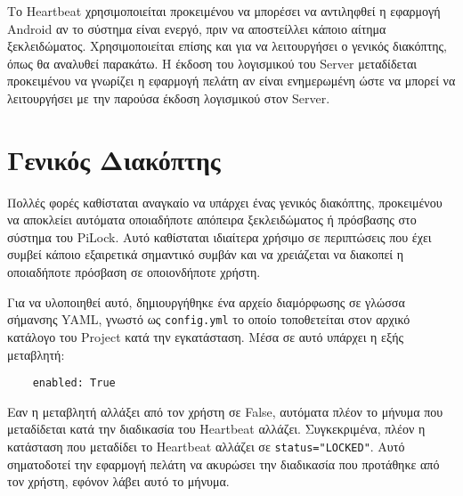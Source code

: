 	Το Heartbeat χρησιμοποιείται προκειμένου να μπορέσει να αντιληφθεί η εφαρμογή Android αν το σύστημα είναι ενεργό, πριν να αποστείλλει κάποιο αίτημα ξεκλειδώματος. Χρησιμοποιείται επίσης και για να λειτουργήσει ο γενικός διακόπτης, όπως θα αναλυθεί παρακάτω. Η έκδοση του λογισμικού του Server μεταδίδεται προκειμένου να γνωρίζει η εφαρμογή πελάτη αν είναι ενημερωμένη ώστε να μπορεί να λειτουργήσει με την παρούσα έκδοση λογισμικού στον Server. 

\section{Γενικός Διακόπτης}
	Πολλές φορές καθίσταται αναγκαίο να υπάρχει ένας γενικός διακόπτης, προκειμένου να αποκλείει αυτόματα οποιαδήποτε απόπειρα ξεκλειδώματος ή πρόσβασης στο σύστημα του PiLock. Αυτό καθίσταται ιδιαίτερα χρήσιμο σε περιπτώσεις που έχει συμβεί κάποιο εξαιρετικά σημαντικό συμβάν και να χρειάζεται να διακοπεί η οποιαδήποτε πρόσβαση σε οποιονδήποτε χρήστη. 

	Για να υλοποιηθεί αυτό, δημιουργήθηκε ένα αρχείο διαμόρφωσης σε γλώσσα σήμανσης YAML, γνωστό ως \verb|config.yml| το οποίο τοποθετείται στον αρχικό κατάλογο του Project κατά την εγκατάσταση. Μέσα σε αυτό υπάρχει η εξής μεταβλητή:

	\begin{lstlisting}
	enabled: True\end{lstlisting}

	Εαν η μεταβλητή αλλάξει από τον χρήστη σε False, αυτόματα πλέον το μήνυμα που μεταδίδεται κατά την διαδικασία του Heartbeat αλλάζει. Συγκεκριμένα, πλέον η κατάσταση που μεταδίδει το Heartbeat αλλάζει σε \verb|status="LOCKED"|. Αυτό σηματοδοτεί την εφαρμογή πελάτη να ακυρώσει την διαδικασία που προτάθηκε από τον χρήστη, εφόνον λάβει αυτό το μήνυμα.